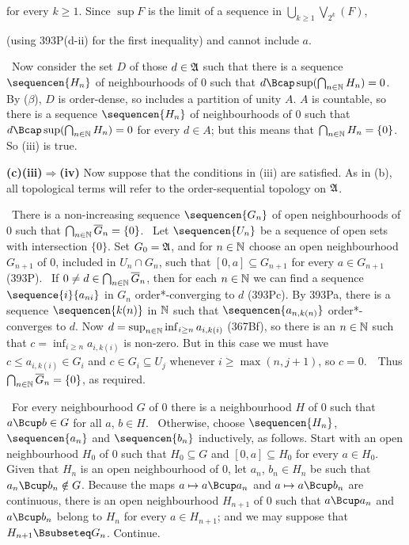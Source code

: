 {

\noindent for every $k\ge 1$.   Since $\sup F$ is the limit of a sequence
in $\bigcup_{k\ge 1}\bigvee_{2^k}(F)$,


\noindent (using 393P(d-ii) for the first inequality)
and cannot include $a$.\ \Qed

\medskip

\quad\grheadc\ Now consider the set $D$ of those $d\in\frak A$ such that
there is a sequence $\sequencen{H_n}$ of neighbourhoods of $0$ such that
$d\Bcap\sup(\bigcap_{n\in\Bbb N}H_n)=0$.
By ($\beta$), $D$ is order-dense, so
includes a partition of unity $A$.   $A$ is countable, so there is a
sequence $\sequencen{H_n}$ of neighbourhoods of $0$ such that
$d\Bcap\sup(\bigcap_{n\in\Bbb N}H_n)=0$ for every $d\in A$;  but this means
that $\bigcap_{n\in\Bbb N}H_n=\{0\}$.   So (iii) is true.

\medskip

{\bf (c)(iii)$\Rightarrow$(iv)} Now suppose that the conditions in (iii)
are satisfied.   As in (b),
all topological terms will refer to the order-sequential
topology on $\frak A$.

\medskip

\quad\grheada\ There is a non-increasing sequence $\sequencen{G_n}$ of open
neighbourhoods of $0$ such that
$\bigcap_{n\in\Bbb N}\overline{G}_n=\{0\}$.
\Prf\ Let $\sequencen{U_n}$
be a sequence of open sets with intersection $\{0\}$.   Set $G_0=\frak A$,
and for $n\in\Bbb N$ choose an open neighbourhood
$G_{n+1}$ of $0$, included in $U_n\cap G_n$, such that
$[0,a]\subseteq G_{n+1}$ for
every $a\in G_{n+1}$ (393P).   \Quer\ If
$0\ne d\in\bigcap_{n\in\Bbb N}\overline{G}_n$, then for each
$n\in\Bbb N$ we can find a sequence
$\sequence{i}{a_{ni}}$ in $G_n$ order*-converging to $d$ (393Pc).   By
393Pa, there is a sequence $\sequencen{k(n)}$
in $\Bbb N$ such that $\sequencen{a_{n,k(n)}}$ order*-converges to $d$.
Now $d=\sup_{n\in\Bbb N}\inf_{i\ge n}a_{i,k(i)}$ (367Bf), so there is an
$n\in\Bbb N$ such that
$c=\inf_{i\ge n}a_{i,k(i)}$ is non-zero.   But in this case we must have
$c\le a_{i,k(i)}\in G_i$ and $c\in G_i\subseteq U_j$ whenever
$i\ge\max(n,j+1)$, so $c=0$.\ \BanG\
Thus $\bigcap_{n\in\Bbb N}\overline{G}_n=\{0\}$, as
required.\ \Qed

\medskip

\quad\grheadb\ For every neighbourhood $G$ of $0$ there is a
neighbourhood $H$ of $0$ such that $a\Bcup b\in G$ for all
$a$, $b\in H$.   \Prf\Quer\ Otherwise, choose $\sequencen{H_n}$,
$\sequencen{a_n}$ and $\sequencen{b_n}$ inductively,
as follows.   Start with an open neighbourhood $H_0$ of $0$ such
that $H_0\subseteq G$ and $[0,a]\subseteq H_0$ for every $a\in H_0$.
Given that $H_n$ is an open neighbourhood of $0$, let $a_n$,
$b_n\in H_n$ be such that $a_n\Bcup b_n\notin G$.   Because
the maps $a\mapsto a\Bcup a_n$ and $a\mapsto a\Bcup b_n$ are continuous,
there is an open neighbourhood $H_{n+1}$ of $0$ such that $a\Bcup a_n$
and $a\Bcup b_n$ belong to $H_n$ for every
$a\in H_{n+1}$;  and we may suppose that $H_{n+1}\Bsubseteq G_n$.
Continue.

}
